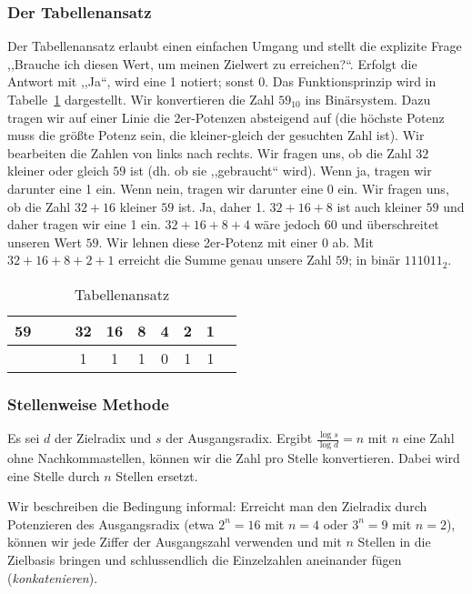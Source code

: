 \subsubsection{Der Tabellenansatz}
%
Der Tabellenansatz erlaubt einen einfachen Umgang und stellt die explizite
Frage ,,Brauche ich diesen Wert, um meinen Zielwert zu erreichen?{}``. Erfolgt
die Antwort mit ,,Ja``, wird eine 1 notiert; sonst 0. Das Funktionsprinzip
wird in Tabelle~\ref{tab:table_approach} dargestellt. Wir konvertieren die
Zahl $59_{10}$ ins Binärsystem. Dazu tragen wir auf einer Linie die
2er-Potenzen absteigend auf (die höchste Potenz muss die größte Potenz sein,
die kleiner-gleich der gesuchten Zahl ist). Wir bearbeiten die Zahlen
von links nach rechts. Wir fragen uns, ob die Zahl $32$ kleiner oder gleich
$59$ ist (dh. ob sie ,,gebraucht`` wird). Wenn ja, tragen wir darunter
eine 1 ein. Wenn nein, tragen wir darunter eine 0 ein.
Wir fragen uns, ob die Zahl $32+16$ kleiner $59$ ist. Ja, daher 1.
$32+16+8$ ist auch kleiner $59$ und daher tragen wir eine 1 ein.
$32+16+8+4$ wäre jedoch $60$ und überschreitet unseren Wert $59$.
Wir lehnen diese 2er-Potenz mit einer $0$ ab. Mit $32+16+8+2+1$ erreicht
die Summe genau unsere Zahl $59$; in binär $111011_2$.
%
\begin{table}[ht]
  \begin{center}
    \begin{tabular}{lccccccccc}
     \hline
      59 & & & 32 & 16 & 8 & 4 & 2 & 1 \\
     \hline \hline
         & & &  1 &  1 & 1 & 0 & 1 & 1
    \end{tabular}
    \caption{Tabellenansatz}
    \label{tab:table_approach}
  \end{center}
\end{table}

\subsubsection{Stellenweise Methode}
%
Es sei $d$ der Zielradix und $s$ der Ausgangsradix. Ergibt
$\frac{\log{s}}{\log{d}} = n$ mit $n$ eine Zahl ohne Nachkommastellen,
können wir die Zahl pro Stelle konvertieren. Dabei wird eine Stelle
durch $n$ Stellen ersetzt.

Wir beschreiben die Bedingung informal: Erreicht man den Zielradix durch
Potenzieren des Ausgangsradix
(etwa $2^n = 16$ mit $n=4$ oder $3^n = 9$ mit $n=2$), können wir jede
Ziffer der Ausgangszahl verwenden und mit $n$ Stellen in die Zielbasis
bringen und schlussendlich die Einzelzahlen aneinander fügen
(\emph{konkatenieren}).

